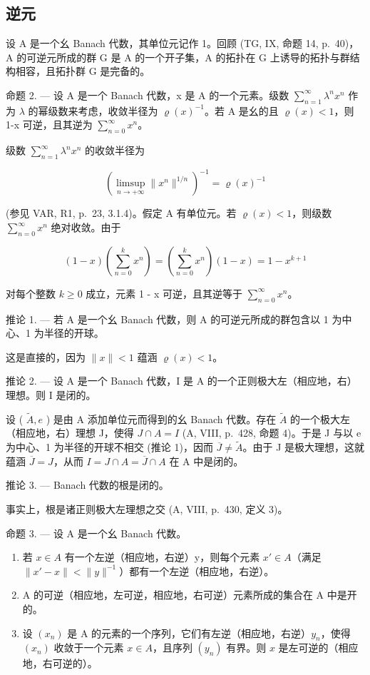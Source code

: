 \subsection{逆元}

设 A 是一个幺 Banach 代数，其单位元记作 1。回顾 (TG, IX, 命题 14, p.~40)，A 的可逆元所成的群 G 是 A 的一个开子集，A 的拓扑在 G 上诱导的拓扑与群结构相容，且拓扑群 G 是完备的。

命题 2. --- 设 A 是一个 Banach 代数，x 是 A 的一个元素。级数 \(\sum_{n=1}^{\infty}\lambda^{n}x^{n}\) 作为 \(\lambda\) 的幂级数来考虑，收敛半径为 \(\varrho(x)^{-1}\)。若 A 是幺的且 \(\varrho(x)<1\)，则 1-x 可逆，且其逆为 \(\sum_{n=0}^{\infty}x^{n}\)。

级数 \(\sum_{n=1}^{\infty}\lambda^{n}x^{n}\) 的收敛半径为

\[
(\limsup _ {n \to + \infty} \| x ^ {n} \| ^ {1 / n}) ^ {- 1} = \varrho (x) ^ {- 1}
\]

(参见 VAR, R1, p.~23, 3.1.4)。假定 A 有单位元。若 \(\varrho(x) < 1\)，则级数 \(\sum_{n=0}^{\infty} x^n\) 绝对收敛。由于

\[
(1 - x) \left(\sum_ {n = 0} ^ {k} x ^ {n}\right) = \left(\sum_ {n = 0} ^ {k} x ^ {n}\right) (1 - x) = 1 - x ^ {k + 1}
\]

对每个整数 \(k \geqslant 0\) 成立，元素 1 - x 可逆，且其逆等于 \(\sum_{n=0}^{\infty} x^{n}\)。

推论 1. --- 若 A 是一个幺 Banach 代数，则 A 的可逆元所成的群包含以 1 为中心、1 为半径的开球。

这是直接的，因为 \(\|x\| < 1\) 蕴涵 \(\varrho(x) < 1\)。

推论 2. --- 设 A 是一个 Banach 代数，I 是 A 的一个正则极大左（相应地，右）理想。则 I 是闭的。

设 ( \(\tilde{A}, e\) ) 是由 A 添加单位元而得到的幺 Banach 代数。存在 \(\tilde{A}\) 的一个极大左（相应地，右）理想 J，使得 \(J \cap A = I\) (A, VIII, p.~428, 命题 4)。于是 J 与以 e 为中心、1 为半径的开球不相交 (推论 1)，因而 \(\overline{J} \neq \widetilde{A}\)。由于 J 是极大理想，这就蕴涵 \(\overline{J} = J\)，从而 \(I = J \cap A = \overline{J} \cap A\) 在 A 中是闭的。

推论 3. --- Banach 代数的根是闭的。

事实上，根是诸正则极大左理想之交 (A, VIII, p.~430, 定义 3)。

命题 3. --- 设 A 是一个幺 Banach 代数。

\begin{enumerate}
\def\labelenumi{\alph{enumi})}
\item
  若 \(x \in A\) 有一个左逆（相应地，右逆）y，则每个元素 \(x' \in A\)（满足 \(\|x' - x\| < \|y\|^{-1}\)）都有一个左逆（相应地，右逆）。
\item
  A 的可逆（相应地，左可逆，相应地，右可逆）元素所成的集合在 A 中是开的。
\item
  设 \((x_{n})\) 是 A 的元素的一个序列，它们有左逆（相应地，右逆）\(y_{n}\)，使得 \((x_{n})\) 收敛于一个元素 \(x \in A\)，且序列 \((y_{n})\) 有界。则 \(x\) 是左可逆的（相应地，右可逆的）。
\end{enumerate}

